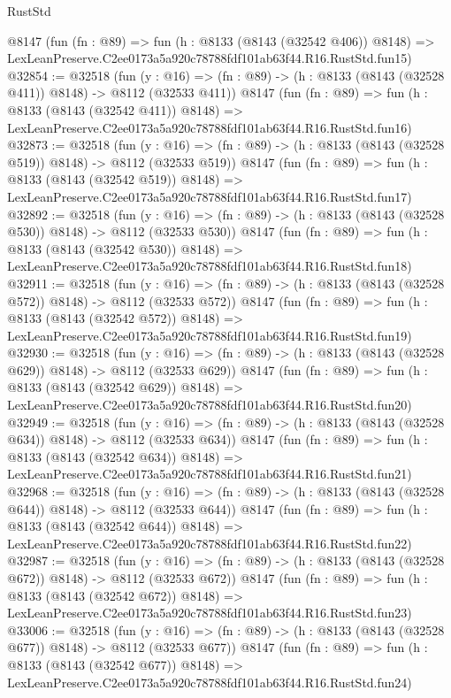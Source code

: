 \begin{lexlean}{RustStd}
\begin{coremodule}
    @8147
    (fun (fn : @89) =>
    fun (h : @8133 (@8143 (@32542 @406)) @8148) =>
    LexLeanPreserve.C2ee0173a5a920c78788fdf101ab63f44.R16.RustStd.fun15)
@32854 := @32518
    (fun (y : @16) => (fn : @89) -> (h : @8133 (@8143 (@32528 @411)) @8148) -> @8112 (@32533 @411))
    @8147
    (fun (fn : @89) =>
    fun (h : @8133 (@8143 (@32542 @411)) @8148) =>
    LexLeanPreserve.C2ee0173a5a920c78788fdf101ab63f44.R16.RustStd.fun16)
@32873 := @32518
    (fun (y : @16) => (fn : @89) -> (h : @8133 (@8143 (@32528 @519)) @8148) -> @8112 (@32533 @519))
    @8147
    (fun (fn : @89) =>
    fun (h : @8133 (@8143 (@32542 @519)) @8148) =>
    LexLeanPreserve.C2ee0173a5a920c78788fdf101ab63f44.R16.RustStd.fun17)
@32892 := @32518
    (fun (y : @16) => (fn : @89) -> (h : @8133 (@8143 (@32528 @530)) @8148) -> @8112 (@32533 @530))
    @8147
    (fun (fn : @89) =>
    fun (h : @8133 (@8143 (@32542 @530)) @8148) =>
    LexLeanPreserve.C2ee0173a5a920c78788fdf101ab63f44.R16.RustStd.fun18)
@32911 := @32518
    (fun (y : @16) => (fn : @89) -> (h : @8133 (@8143 (@32528 @572)) @8148) -> @8112 (@32533 @572))
    @8147
    (fun (fn : @89) =>
    fun (h : @8133 (@8143 (@32542 @572)) @8148) =>
    LexLeanPreserve.C2ee0173a5a920c78788fdf101ab63f44.R16.RustStd.fun19)
@32930 := @32518
    (fun (y : @16) => (fn : @89) -> (h : @8133 (@8143 (@32528 @629)) @8148) -> @8112 (@32533 @629))
    @8147
    (fun (fn : @89) =>
    fun (h : @8133 (@8143 (@32542 @629)) @8148) =>
    LexLeanPreserve.C2ee0173a5a920c78788fdf101ab63f44.R16.RustStd.fun20)
@32949 := @32518
    (fun (y : @16) => (fn : @89) -> (h : @8133 (@8143 (@32528 @634)) @8148) -> @8112 (@32533 @634))
    @8147
    (fun (fn : @89) =>
    fun (h : @8133 (@8143 (@32542 @634)) @8148) =>
    LexLeanPreserve.C2ee0173a5a920c78788fdf101ab63f44.R16.RustStd.fun21)
@32968 := @32518
    (fun (y : @16) => (fn : @89) -> (h : @8133 (@8143 (@32528 @644)) @8148) -> @8112 (@32533 @644))
    @8147
    (fun (fn : @89) =>
    fun (h : @8133 (@8143 (@32542 @644)) @8148) =>
    LexLeanPreserve.C2ee0173a5a920c78788fdf101ab63f44.R16.RustStd.fun22)
@32987 := @32518
    (fun (y : @16) => (fn : @89) -> (h : @8133 (@8143 (@32528 @672)) @8148) -> @8112 (@32533 @672))
    @8147
    (fun (fn : @89) =>
    fun (h : @8133 (@8143 (@32542 @672)) @8148) =>
    LexLeanPreserve.C2ee0173a5a920c78788fdf101ab63f44.R16.RustStd.fun23)
@33006 := @32518
    (fun (y : @16) => (fn : @89) -> (h : @8133 (@8143 (@32528 @677)) @8148) -> @8112 (@32533 @677))
    @8147
    (fun (fn : @89) =>
    fun (h : @8133 (@8143 (@32542 @677)) @8148) =>
    LexLeanPreserve.C2ee0173a5a920c78788fdf101ab63f44.R16.RustStd.fun24)

\end{coremodule}
\end{lexlean}
